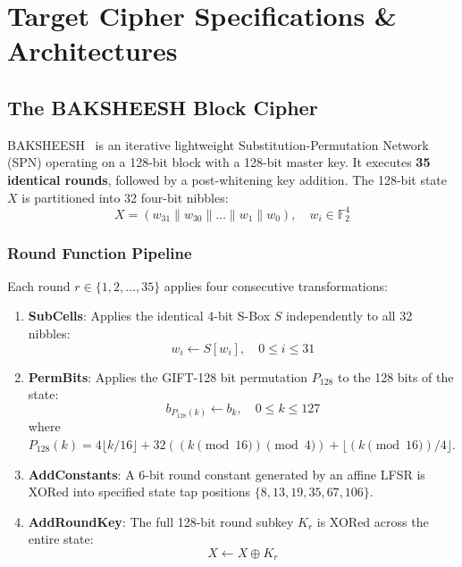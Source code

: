 \documentclass[12pt,a4paper,oneside]{report}
\begin{document}
\chapter{Target Cipher Specifications \& Architectures}
\label{ch:ciphers}

\section{The BAKSHEESH Block Cipher}
\label{sec:baksheesh_spec}
BAKSHEESH~\cite{baksi2023baksheesh} is an iterative lightweight Substitution-Permutation Network (SPN) operating on a 128-bit block with a 128-bit master key. It executes \textbf{35 identical rounds}, followed by a post-whitening key addition. The 128-bit state $X$ is partitioned into 32 four-bit nibbles:
\begin{equation}
    X = (w_{31} \parallel w_{30} \parallel \dots \parallel w_1 \parallel w_0), \quad w_i \in \mathbb{F}_2^4
\end{equation}

\subsection{Round Function Pipeline}
Each round $r \in \{1, 2, \dots, 35\}$ applies four consecutive transformations:
\begin{enumerate}
    \item \textbf{SubCells}: Applies the identical 4-bit S-Box $S$ independently to all 32 nibbles:
    \begin{equation}
        w_i \leftarrow S[w_i], \quad 0 \le i \le 31
    \end{equation}
    \item \textbf{PermBits}: Applies the GIFT-128 bit permutation $P_{128}$ to the 128 bits of the state:
    \begin{equation}
        b_{P_{128}(k)} \leftarrow b_k, \quad 0 \le k \le 127
    \end{equation}
    where $P_{128}(k) = 4 \lfloor k / 16 \rfloor + 32 ((k \pmod{16}) \pmod 4) + \lfloor (k \pmod{16}) / 4 \rfloor$.
    \item \textbf{AddConstants}: A 6-bit round constant generated by an affine LFSR is XORed into specified state tap positions $\{8, 13, 19, 35, 67, 106\}$.
    \item \textbf{AddRoundKey}: The full 128-bit round subkey $K_r$ is XORed across the entire state:
    \begin{equation}
        X \leftarrow X \oplus K_r
    \end{equation}
\end{enumerate}
\end{document}
